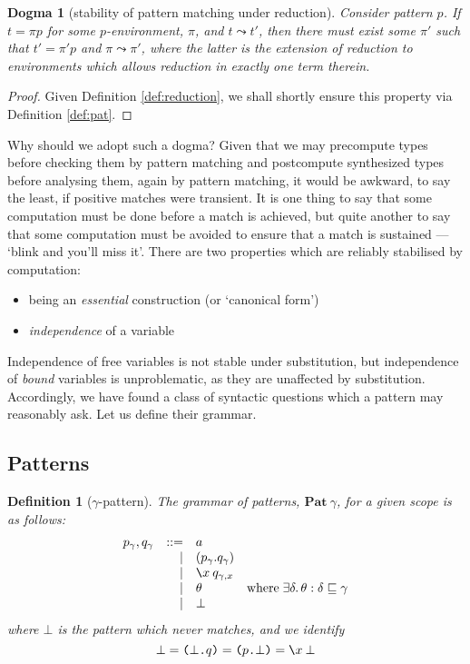 \documentclass{jfp1}
\newtheorem{definition}[theorem]{Definition}
\newtheorem{dogma}[theorem]{Dogma}
\newcommand{\Pa}[1]{\texttt{(}#1\texttt{)}}
\newcommand{\dt}{\texttt{.}}
\newcommand{\cn}[2]{\Pa{#1 \dt #2}}
\begin{document}
\begin{dogma}[stability of pattern matching under reduction]
  Consider pattern $p$. If $t=\pi p$ for some $p$-environment, $\pi$,
  and $t\leadsto t'$, then there must exist some $\pi'$ such that
  $t'=\pi' p$ and $\pi\leadsto\pi'$, where the latter is the
  extension of reduction to environments which allows reduction in exactly
  one term therein.
\end{dogma}
\begin{proof}
  Given Definition \ref{def:reduction}, we shall shortly ensure this property
  via Definition \ref{def:pat}.
\end{proof}

Why should we adopt such a dogma? Given that we may precompute types
before checking them by pattern matching and postcompute synthesized
types before analysing them, again by pattern matching, it would be
awkward, to say the least, if positive matches were transient. It is
one thing to say that some computation must be done before a match is
achieved, but quite another to say that some computation must be
avoided to ensure that a match is sustained --- `blink and you'll
miss it'. There are two properties which are reliably stabilised
by computation:
\begin{itemize}
\item being an \emph{essential} construction (or `canonical form')
\item \emph{independence} of a variable
\end{itemize}

Independence of free variables is not stable under substitution,
but independence of \emph{bound} variables is unproblematic, as they
are unaffected by substitution. Accordingly, we have found a class
of syntactic questions which a pattern may reasonably ask. Let us
define their grammar.


\subsection{Patterns}

\newcommand{\Pat}[1]{\textbf{Pat}\:#1}
\begin{definition}[$\gamma$-pattern\label{def:pat}]
The grammar of patterns, $\Pat\gamma$, for a given scope is as follows:
\[\begin{array}{rrl@{\quad}l}
    p_\gamma, q_\gamma & ::= & a \\
         &   | & (p_\gamma.q_\gamma) \\
         &   | & \la x q_{\gamma,x} \\
         &   | & \theta & \mbox{where}\;\exists\delta.\,\theta :
                          \delta\thin\gamma \\
         &   | & \bot
  \end{array}\]
where $\bot$ is the pattern which \emph{never} matches, and we identify
\[\bot = \cn\bot q = \cn p\bot = \la x\bot
  \]
\end{definition}
\end{document}
